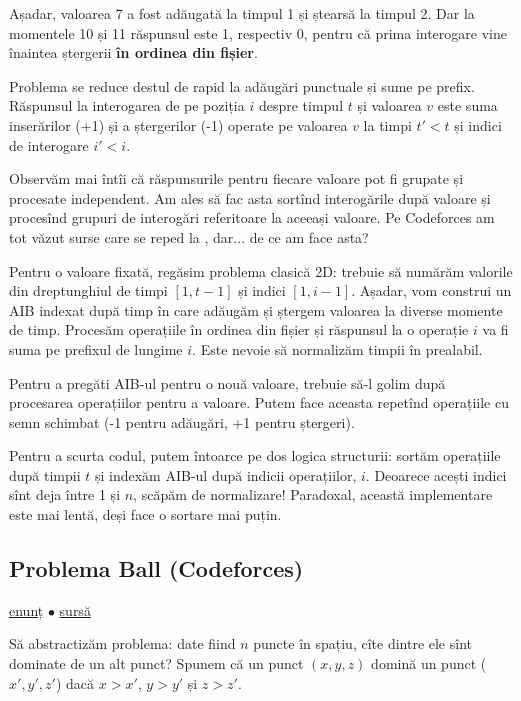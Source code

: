 Așadar, valoarea 7 a fost adăugată la timpul 1 și ștearsă la timpul 2. Dar la momentele 10 și 11 răspunsul este 1, respectiv 0, pentru că prima interogare vine înaintea ștergerii \textbf{în ordinea din fișier}.

Problema se reduce destul de rapid la adăugări punctuale și sume pe prefix. Răspunsul la interogarea de pe poziția $i$ despre timpul $t$ și valoarea $v$ este suma inserărilor (+1) și a ștergerilor (-1) operate pe valoarea $v$ la timpi $t' < t$ și indici de interogare $i' < i$.

Observăm mai întîi că răspunsurile pentru fiecare valoare pot fi grupate și procesate independent. Am ales să fac asta sortînd interogările după valoare și procesînd grupuri de interogări referitoare la aceeași valoare. Pe Codeforces am tot văzut surse care se reped la , dar... de ce am face asta?

Pentru o valoare fixată, regăsim problema clasică 2D: trebuie să numărăm valorile din dreptunghiul de timpi $[1, t - 1]$ și indici $[1, i - 1]$. Așadar, vom construi un AIB indexat după timp în care adăugăm și ștergem valoarea la diverse momente de timp. Procesăm operațiile în ordinea din fișier și răspunsul la o operație $i$ va fi suma pe prefixul de lungime $i$. Este nevoie să normalizăm timpii în prealabil.

Pentru a pregăti AIB-ul pentru o nouă valoare, trebuie să-l golim după procesarea operațiilor pentru a valoare. Putem face aceasta repetînd operațiile cu semn schimbat (-1 pentru adăugări, +1 pentru ștergeri).

Pentru a scurta codul, putem întoarce pe dos logica structurii: sortăm operațiile după timpii $t$ și indexăm AIB-ul după indicii operațiilor, $i$. Deoarece acești indici sînt deja între 1 și $n$, scăpăm de normalizare! Paradoxal, această implementare este mai lentă, deși face o sortare mai puțin. 

\subsection{Problema Ball (Codeforces)}
\label{problem:ball}

\href{https://codeforces.com/contest/12/problem/D}{enunț}
$\bullet$
\hyperref[code:ball]{sursă}

Să abstractizăm problema: date fiind $n$ puncte în spațiu, cîte dintre ele sînt dominate de un alt punct? Spunem că un punct $(x,y,z)$ domină un punct ($x', y', z'$) dacă $x > x'$, $y > y'$ și $z > z'$.

